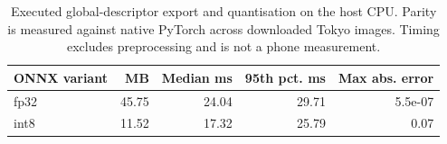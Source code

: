 \begin{table}[htbp]\centering\small
\caption{Executed global-descriptor export and quantisation on the host CPU. Parity is measured against native PyTorch across downloaded Tokyo images. Timing excludes preprocessing and is not a phone measurement.}\label{tab:exports}
\begin{tabular}{lrrrr}
\toprule
ONNX variant & MB & Median ms & 95th pct. ms & Max abs. error \\
\midrule
fp32 & 45.75 & 24.04 & 29.71 & 5.5e-07 \\
int8 & 11.52 & 17.32 & 25.79 & 0.07 \\
\bottomrule
\end{tabular}\end{table}
